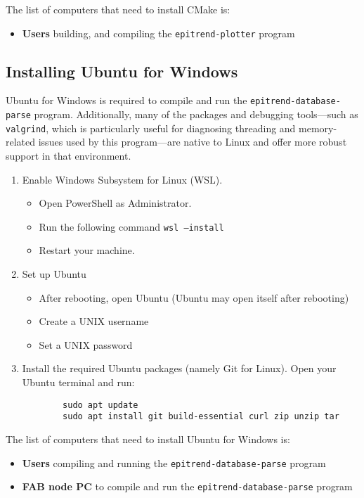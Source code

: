 \documentclass{article}
\begin{document}
The list of computers that need to install CMake is:
\begin{itemize}
    \item \textbf{Users} building, and compiling the \texttt{epitrend-plotter} program
\end{itemize}
\subsection{Installing Ubuntu for Windows}
\label{sec:Installing_Ubuntu_for_Windows}
Ubuntu for Windows is required to compile and run the \texttt{epitrend-database-parse} program. Additionally, many of the packages and debugging tools—such as \texttt{valgrind}, which is particularly useful for diagnosing threading and memory-related issues used by this program—are native to Linux and offer more robust support in that environment.
\begin{enumerate}
    \item Enable Windows Subsystem for Linux (WSL).
    \begin{itemize}
        \item Open PowerShell as Administrator.
        \item Run the following command \texttt{wsl --install}
        \item Restart your machine.
    \end{itemize}
    
    \item Set up Ubuntu
    \begin{itemize}
        \item After rebooting, open Ubuntu (Ubuntu may open itself after rebooting)
        \item Create a UNIX username
        \item Set a UNIX password
    \end{itemize}

    \item Install the required Ubuntu packages (namely Git for Linux). Open your Ubuntu terminal and run:
    \begin{verbatim}
        sudo apt update
        sudo apt install git build-essential curl zip unzip tar
    \end{verbatim}
\end{enumerate}
The list of computers that need to install Ubuntu for Windows is:
\begin{itemize}
    \item \textbf{Users} compiling and running the \texttt{epitrend-database-parse} program
    \item \textbf{FAB node PC} to compile and run the \texttt{epitrend-database-parse} program
\end{itemize}
\end{document}
